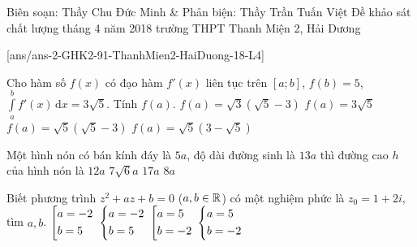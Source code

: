 \begin{name}
{Biên soạn: Thầy Chu Đức Minh \& Phản biện: Thầy Trần Tuấn Việt}
{Đề khảo sát chất lượng tháng 4 năm 2018 trường THPT Thanh Miện 2, Hải Dương}
\end{name}
\setcounter{ex}{0}\setcounter{bt}{0}
[ans/ans-2-GHK2-91-ThanhMien2-HaiDuong-18-L4]
\begin{ex}%
Cho hàm số $f(x)$ có đạo hàm $f'(x)$ liên tục trên $[a;b]$, $f(b) = 5$, $\displaystyle \int\limits_{a}^{b} f'(x) \mathrm{\, d}x = 3\sqrt{5}$. Tính $f(a)$. 
	\choice
	{$f(a) = \sqrt{3}(\sqrt{5}- 3)$}
	{$f(a) = 3\sqrt{5}$}
	{\True $f(a) = \sqrt{5}(\sqrt{5} - 3)$}
	{$f(a) = \sqrt{5}(3 - \sqrt{5})$}
\end{ex}

\begin{ex}%
Một hình nón có bán kính đáy là $5a$, độ dài đường sinh là $13a$ thì đường cao $h$ của hình nón là 
	\choice
	{\True $12a$}
	{$7\sqrt{6}a$}
	{$17a$}
	{$8a$}
\end{ex}

\begin{ex}%
Biết phương trình $z^2 + az + b = 0$ ($a, b \in \Bbb{R}$) có một nghiệm phức là $z_0 = 1 + 2i$, tìm $a, b$. 
	\choice
	{$\left[\begin{aligned}& a = -2\\ &b = 5\end{aligned}\right.$}
	{\True $\left\{\begin{aligned}& a = -2\\ &b = 5\end{aligned}\right.$}
	{$\left[\begin{aligned}&a = 5\\ & b =  - 2\end{aligned}\right.$}
	{$\left\{\begin{aligned}& a = 5\\ &b = - 2\end{aligned}\right.$}
\end{ex}

